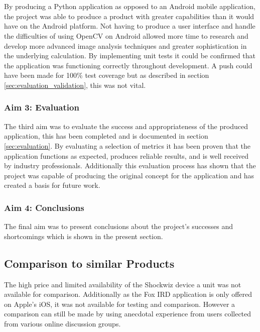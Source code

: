 			\\\\
			By producing a Python application as opposed to an Android mobile application, the project was able to produce a product with greater capabilities than it would have on the Android platform. Not having to produce a user interface and handle the difficulties of using OpenCV on Android allowed more time to research and develop more advanced image analysis techniques and greater sophistication in the underlying calculation. By implementing unit tests it could be confirmed that the application was functioning correctly throughout development. A push could have been made for 100\% test coverage but as described in section \ref{sec:evaluation_validation}, this was not vital.
		\subsubsection{Aim 3: Evaluation}
			The third aim was to evaluate the success and appropriateness of the produced application, this has been completed and is documented in section \ref{sec:evaluation}. By evaluating a selection of metrics it has been proven that the application functions as expected, produces reliable results, and is well received by industry professionals. Additionally this evaluation process has shown that the project was capable of producing the original concept for the application and has created a basis for future work.
		\subsubsection{Aim 4: Conclusions}
			The final aim was to present conclusions about the project's successes and shortcomings which is shown in the present section.
	\subsection{Comparison to similar Products}
		The high price and limited availability of the Shockwiz device a unit was not available for comparison. Additionally as the Fox IRD application is only offered on Apple's iOS, it was not available for testing and comparison. However a comparison can still be made by using anecdotal experience from users collected from various online discussion groups.
